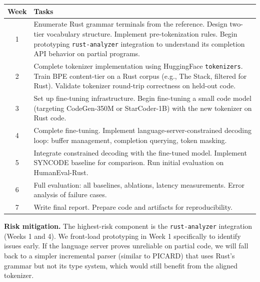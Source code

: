 \documentclass[11pt,letterpaper]{article}
\begin{document}
\begin{table}[h]
\centering
\small
\begin{tabular}{@{}cp{5.2in}@{}}
\toprule
\textbf{Week} & \textbf{Tasks} \\
\midrule
1 & Enumerate Rust grammar terminals from the reference. Design two-tier vocabulary structure. Implement pre-tokenization rules. Begin prototyping \texttt{rust-analyzer} integration to understand its completion API behavior on partial programs. \\
2 & Complete tokenizer implementation using HuggingFace \texttt{tokenizers}. Train BPE content-tier on a Rust corpus (e.g., The Stack, filtered for Rust). Validate tokenizer round-trip correctness on held-out code. \\
3 & Set up fine-tuning infrastructure. Begin fine-tuning a small code model (targeting CodeGen-350M or StarCoder-1B) with the new tokenizer on Rust code. \\
4 & Complete fine-tuning. Implement language-server-constrained decoding loop: buffer management, completion querying, token masking. \\
5 & Integrate constrained decoding with the fine-tuned model. Implement SYNCODE baseline for comparison. Run initial evaluation on HumanEval-Rust. \\
6 & Full evaluation: all baselines, ablations, latency measurements. Error analysis of failure cases. \\
7 & Write final report. Prepare code and artifacts for reproducibility. \\
\bottomrule
\end{tabular}
\end{table}

\textbf{Risk mitigation.}
The highest-risk component is the \texttt{rust-analyzer} integration (Weeks 1 and 4). We front-load prototyping in Week 1 specifically to identify issues early. If the language server proves unreliable on partial code, we will fall back to a simpler incremental parser (similar to PICARD) that uses Rust's grammar but not its type system, which would still benefit from the aligned tokenizer.



\end{document}
